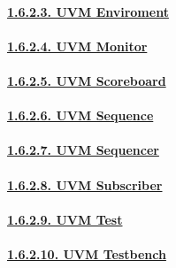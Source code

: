 \documentclass[
]{article}
\begin{document}
\hypertarget{uvm-enviroment}{%
\paragraph{\texorpdfstring{\protect\hyperlink{uvm-enviroment-1}{1.6.2.3.
UVM Enviroment}}{1.6.2.3. UVM Enviroment}}\label{uvm-enviroment}}

\hypertarget{uvm-monitor}{%
\paragraph{\texorpdfstring{\protect\hyperlink{uvm-monitor-1}{1.6.2.4.
UVM Monitor}}{1.6.2.4. UVM Monitor}}\label{uvm-monitor}}

\hypertarget{uvm-scoreboard}{%
\paragraph{\texorpdfstring{\protect\hyperlink{uvm-scoreboard-1}{1.6.2.5.
UVM Scoreboard}}{1.6.2.5. UVM Scoreboard}}\label{uvm-scoreboard}}

\hypertarget{uvm-sequence}{%
\paragraph{\texorpdfstring{\protect\hyperlink{uvm-sequence-1}{1.6.2.6.
UVM Sequence}}{1.6.2.6. UVM Sequence}}\label{uvm-sequence}}

\hypertarget{uvm-sequencer}{%
\paragraph{\texorpdfstring{\protect\hyperlink{uvm-sequencer-1}{1.6.2.7.
UVM Sequencer}}{1.6.2.7. UVM Sequencer}}\label{uvm-sequencer}}

\hypertarget{uvm-subscriber}{%
\paragraph{\texorpdfstring{\protect\hyperlink{uvm-subscriber-1}{1.6.2.8.
UVM Subscriber}}{1.6.2.8. UVM Subscriber}}\label{uvm-subscriber}}

\hypertarget{uvm-test}{%
\paragraph{\texorpdfstring{\protect\hyperlink{uvm-test-1}{1.6.2.9. UVM
Test}}{1.6.2.9. UVM Test}}\label{uvm-test}}

\hypertarget{uvm-testbench}{%
\paragraph{\texorpdfstring{\protect\hyperlink{uvm-testbench-1}{1.6.2.10.
UVM Testbench}}{1.6.2.10. UVM Testbench}}\label{uvm-testbench}}
\end{document}
